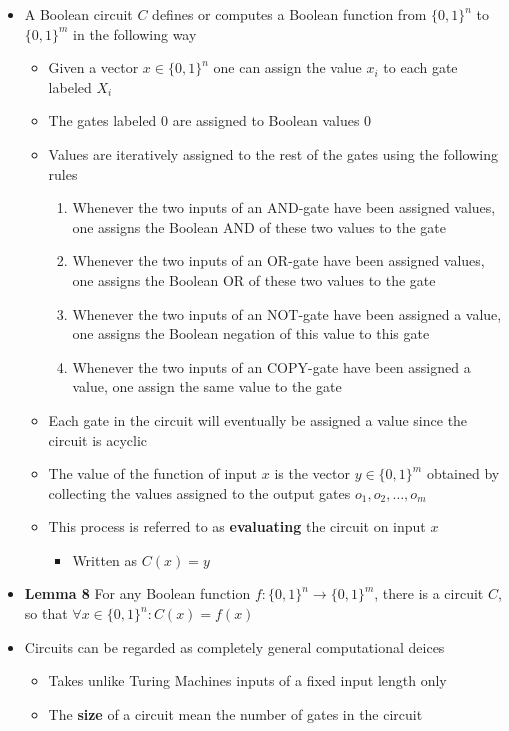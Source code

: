 \documentclass[11pt]{article}
\begin{document}
\begin{itemize}
\item A Boolean circuit \(C\) defines or computes a Boolean function from \(\{0,1\}^n\) to \(\{0,1\}^m\) in the following way
\begin{itemize}
\item Given a vector \(x \in \{0,1\}^n\) one can assign the value \(x_i\) to each gate labeled \(X_i\)
\item The gates labeled \(0\) are assigned to Boolean values 0
\item Values are iteratively assigned to the rest of the gates using the following rules
\begin{enumerate}
\item Whenever the two inputs of an AND-gate have been assigned values, one assigns the Boolean AND of these two values to the gate
\item Whenever the two inputs of an OR-gate have been assigned values, one assigns the Boolean OR of these two values to the gate
\item Whenever the two inputs of an NOT-gate have been assigned a value, one assigns the Boolean negation of this value to this gate
\item Whenever the two inputs of an COPY-gate have been assigned a value, one assign the same value to the gate
\end{enumerate}
\item Each gate in the circuit will eventually be assigned a value since the circuit is acyclic
\item The value of the function of input \(x\) is the vector \(y \in \{0,1\}^m\) obtained by collecting the values assigned to the output gates \(o_1, o_2, \dots, o_m\)
\item This process is referred to as \textbf{evaluating} the circuit on input \(x\)
\begin{itemize}
\item Written as \(C(x) = y\)
\end{itemize}
\end{itemize}

\item \textbf{Lemma 8} For any Boolean function \(f: \{0,1\}^n \rightarrow \{0,1\}^m\), there is a circuit \(C\), so that \(\forall x \in \{0,1\}^n : C(x) = f(x)\)

\item Circuits can be regarded as completely general computational deices
\begin{itemize}
\item Takes unlike Turing Machines inputs of a fixed input length only
\item The \textbf{size} of a circuit mean the number of gates in the circuit
\end{itemize}


\end{itemize}
\end{document}
